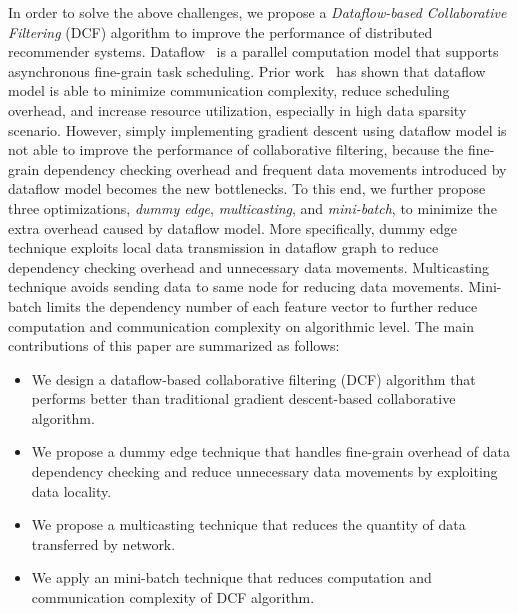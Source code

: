 \documentclass{llncs}
\begin{document}
In order to solve the above challenges, we propose a {\it Dataflow-based Collaborative Filtering} (DCF) algorithm to improve the performance of distributed recommender systems. Dataflow~\cite{dataflow} is a parallel computation model that
supports asynchronous fine-grain task scheduling. Prior work~\cite{xxx} has shown that dataflow model is able to minimize communication complexity, reduce scheduling overhead, and increase resource utilization, especially in high data sparsity scenario. However, simply implementing gradient descent using dataflow model is not able to improve the performance of collaborative filtering, because the fine-grain dependency checking overhead and frequent data movements introduced by dataflow model becomes the new bottlenecks.
To this end, we further propose three optimizations, {\it dummy edge}, {\it multicasting}, and {\it mini-batch}, to minimize the extra overhead caused by dataflow model. More specifically, dummy edge technique exploits local data transmission in dataflow graph to reduce dependency checking overhead and unnecessary data movements. Multicasting technique avoids sending data to same node for reducing data movements. Mini-batch limits the dependency number of each feature vector to further reduce computation and communication complexity on algorithmic level. The main contributions of this paper are summarized as follows:
\vspace{-5pt}
\begin{itemize}
\item We design a dataflow-based collaborative filtering (DCF) algorithm that performs better than traditional gradient descent-based collaborative algorithm.
\item We propose a dummy edge technique that handles fine-grain overhead of data dependency checking and reduce unnecessary data movements by exploiting  data locality.
\item We propose a multicasting technique that reduces the quantity of data transferred by network.
\item We apply an mini-batch technique that reduces computation and communication complexity of DCF algorithm.
\end{itemize}
\vspace{-5pt}
\end{document}
